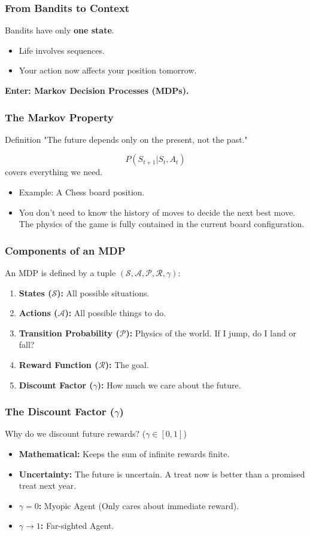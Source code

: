\documentclass[aspectratio=169]{beamer}
\begin{document}
\begin{frame}
    \frametitle{From Bandits to Context}
    Bandits have only \textbf{one state}.
    \begin{itemize}
        \item Life involves sequences.
        \item Your action now affects your position tomorrow.
    \end{itemize}
    \textbf{Enter: Markov Decision Processes (MDPs).}
\end{frame}

\begin{frame}
    \frametitle{The Markov Property}
    \begin{block}{Definition}
        "The future depends only on the present, not the past."
    \end{block}
    \vspace{0.5cm}
    $$P(S_{t+1} | S_t, A_t)$$
    covers everything we need.
    \begin{itemize}
        \item Example: A Chess board position.
        \item You don't need to know the history of moves to decide the next best move. The physics of the game is fully contained in the current board configuration.
    \end{itemize}
\end{frame}

\begin{frame}
    \frametitle{Components of an MDP}
    An MDP is defined by a tuple $(\mathcal{S}, \mathcal{A}, \mathcal{P}, \mathcal{R}, \gamma)$:
    \begin{enumerate}
        \item \textbf{States ($\mathcal{S}$):} All possible situations.
        \item \textbf{Actions ($\mathcal{A}$):} All possible things to do.
        \item \textbf{Transition Probability ($\mathcal{P}$):} Physics of the world. If I jump, do I land or fall?
        \item \textbf{Reward Function ($\mathcal{R}$):} The goal.
        \item \textbf{Discount Factor ($\gamma$):} How much we care about the future.
    \end{enumerate}
\end{frame}

\begin{frame}
    \frametitle{The Discount Factor ($\gamma$)}
    Why do we discount future rewards? ($\gamma \in [0, 1]$)
    \begin{itemize}
        \item \textbf{Mathematical:} Keeps the sum of infinite rewards finite.
        \item \textbf{Uncertainty:} The future is uncertain. A treat now is better than a promised treat next year.
        \item \textbf{$\gamma = 0$:} Myopic Agent (Only cares about immediate reward).
        \item \textbf{$\gamma \to 1$:} Far-sighted Agent.
    \end{itemize}
\end{frame}
\end{document}
